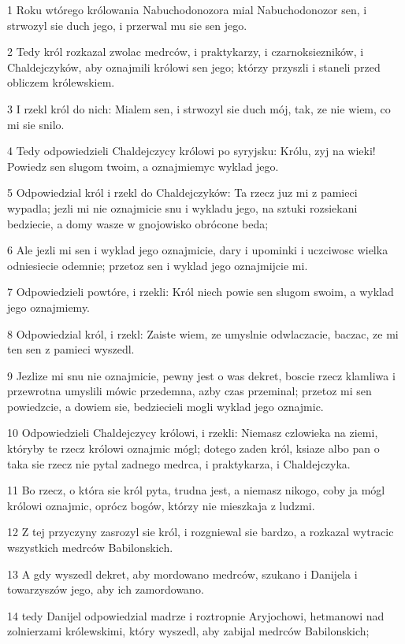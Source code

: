 \par 1 Roku wtórego królowania Nabuchodonozora mial Nabuchodonozor sen, i strwozyl sie duch jego, i przerwal mu sie sen jego.
\par 2 Tedy król rozkazal zwolac medrców, i praktykarzy, i czarnoksiezników, i Chaldejczyków, aby oznajmili królowi sen jego; którzy przyszli i staneli przed obliczem królewskiem.
\par 3 I rzekl król do nich: Mialem sen, i strwozyl sie duch mój, tak, ze nie wiem, co mi sie snilo.
\par 4 Tedy odpowiedzieli Chaldejczycy królowi po syryjsku: Królu, zyj na wieki! Powiedz sen slugom twoim, a oznajmiemyc wyklad jego.
\par 5 Odpowiedzial król i rzekl do Chaldejczyków: Ta rzecz juz mi z pamieci wypadla; jezli mi nie oznajmicie snu i wykladu jego, na sztuki rozsiekani bedziecie, a domy wasze w gnojowisko obrócone beda;
\par 6 Ale jezli mi sen i wyklad jego oznajmicie, dary i upominki i uczciwosc wielka odniesiecie odemnie; przetoz sen i wyklad jego oznajmijcie mi.
\par 7 Odpowiedzieli powtóre, i rzekli: Król niech powie sen slugom swoim, a wyklad jego oznajmiemy.
\par 8 Odpowiedzial król, i rzekl: Zaiste wiem, ze umyslnie odwlaczacie, baczac, ze mi ten sen z pamieci wyszedl.
\par 9 Jezlize mi snu nie oznajmicie, pewny jest o was dekret, boscie rzecz klamliwa i przewrotna umyslili mówic przedemna, azby czas przeminal; przetoz mi sen powiedzcie, a dowiem sie, bedziecieli mogli wyklad jego oznajmic.
\par 10 Odpowiedzieli Chaldejczycy królowi, i rzekli: Niemasz czlowieka na ziemi, któryby te rzecz królowi oznajmic mógl; dotego zaden król, ksiaze albo pan o taka sie rzecz nie pytal zadnego medrca, i praktykarza, i Chaldejczyka.
\par 11 Bo rzecz, o która sie król pyta, trudna jest, a niemasz nikogo, coby ja mógl królowi oznajmic, oprócz bogów, którzy nie mieszkaja z ludzmi.
\par 12 Z tej przyczyny zasrozyl sie król, i rozgniewal sie bardzo, a rozkazal wytracic wszystkich medrców Babilonskich.
\par 13 A gdy wyszedl dekret, aby mordowano medrców, szukano i Danijela i towarzyszów jego, aby ich zamordowano.
\par 14 tedy Danijel odpowiedzial madrze i roztropnie Aryjochowi, hetmanowi nad zolnierzami królewskimi, który wyszedl, aby zabijal medrców Babilonskich;
